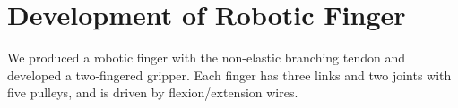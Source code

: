 \documentclass{llncs}
\begin{document}

																																			




\section{Development of Robotic Finger} %
\label{sec:producing}
	
We produced a robotic finger with the non-elastic branching tendon and developed a two-fingered gripper.
Each finger has three links and two joints with five pulleys, and is driven by flexion/extension wires.

\end{document}
